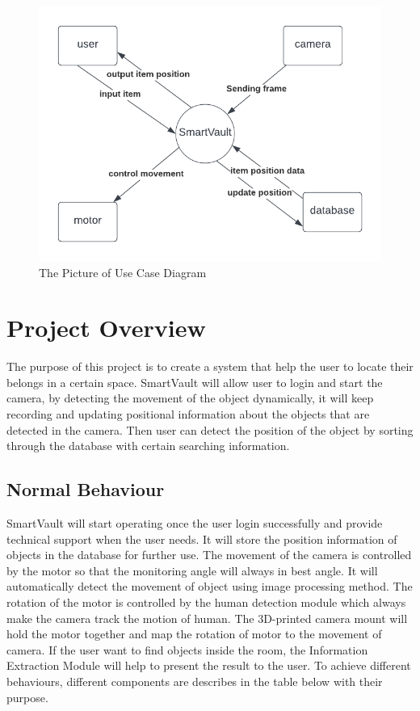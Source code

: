 \documentclass[12pt, titlepage]{article}
\begin{document}
\begin{figure}[H]
    \centering
    \includegraphics[scale=0.8]{work_context.png}
    \caption{The Picture of Use Case Diagram}
\end{figure}

\section{Project Overview}
The purpose of this project is to create a system that help the user to locate their belongs in a certain space. SmartVault will allow user to login and start the camera, by detecting the movement of the object dynamically, it will keep recording and updating positional information about the objects that are detected in the camera. Then user can detect the position of the object by sorting through the database with certain searching information.
\subsection{Normal Behaviour}
SmartVault will start operating once the user login successfully and provide technical support when the user needs. It will store the position information of objects in the database for further use. The movement of the camera is controlled by the motor so that the monitoring angle will always in best angle. It will automatically detect the movement of object using image processing method. The rotation of the motor is controlled by the human detection module which always make the camera track the motion of human. The 3D-printed camera mount will hold the motor together and map the rotation of motor to the movement of camera. If the user want to find objects inside the room, the Information Extraction Module will help to present the result to the user. To achieve different behaviours, different components are describes in the table below with their purpose. 
\end{document}
